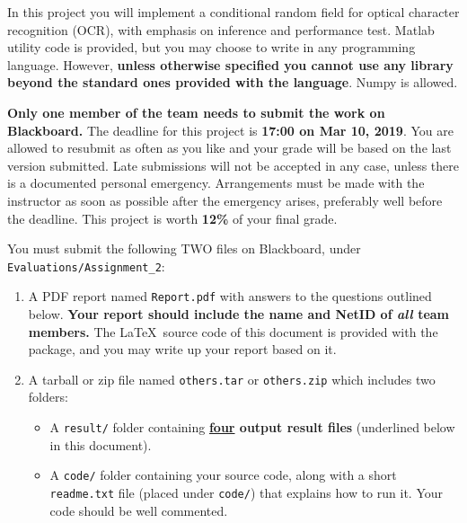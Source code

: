 \documentclass[11pt]{report}
\begin{document}
	
	\maketitle
	
	
	In this project you will implement a conditional random field for optical character recognition (OCR),
	with emphasis on inference and performance test.
	Matlab utility code is provided, but you may choose to write in any programming
	language.
	However, {\bf unless otherwise specified you cannot use any library beyond the standard ones provided with the language}.
	Numpy is allowed.
	
	{\bf Only one member of the team needs to submit the work on Blackboard.}
	The deadline for this project is {\bf 17:00 on Mar 10, 2019}.
	You are allowed to resubmit as often
	as you like and your grade will be based on the last version submitted.
	Late submissions will not be accepted in any case, unless there is a documented personal emergency.  Arrangements must be made with the instructor as soon as possible after the emergency arises,
	preferably well before the deadline.
	This project is worth {\bf 12\%} of your final grade.
	
	You must submit the following TWO files on Blackboard, under \verb#Evaluations/Assignment_2#:
	\vspace{-1em}
	\begin{enumerate}
		\item  A PDF report named \verb#Report.pdf# with answers to the questions outlined below.
		{\bf Your report should include the name and NetID of \emph{all} team members.}
		The \LaTeX\ source code of this document is provided with the package, and you may write up your report based on it.
		\item A tarball or zip file named \verb#others.tar# or \verb#others.zip# which includes two folders: 
		\begin{itemize}[leftmargin=*]
			\item A \verb#result/# folder containing {\bf \underline{four} output result files} (underlined below in this document).
			\item A \verb#code/# folder containing your source code, along with a short \verb#readme.txt# file (placed under \verb#code/#) that explains how to run it.
			Your code should be well commented.
		\end{itemize}
	\end{enumerate}
	\vspace{-1em}
	
\end{document}
